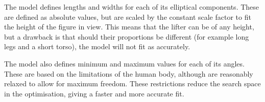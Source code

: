 The model defines lengths and widths for each of its elliptical components. These are defined as absolute values, but are scaled by the constant scale factor to fit the height of the figure in view. This means that the lifter can be of any height, but a drawback is that should their proportions be different (for example long legs and a short torso), the model will not fit as accurately.

The model also defines minimum and maximum values for each of its angles. These are based on the limitations of the human body, although are reasonably relaxed to allow for maximum freedom. These restrictions reduce the search space in the optimisation, giving a faster and more accurate fit.